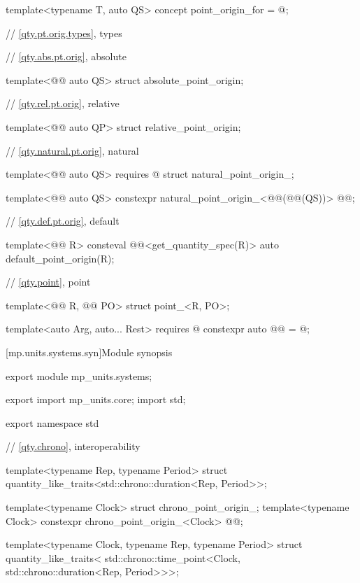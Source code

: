 \begin{codeblock}
{template<typename T, auto QS>
concept point_origin_for = @\seebelownc@;

// \ref{qty.pt.orig.types}, types

// \ref{qty.abs.pt.orig}, absolute

template<@@ auto QS>
struct absolute_point_origin;

// \ref{qty.rel.pt.orig}, relative

template<@@ auto QP>
struct relative_point_origin;

// \ref{qty.natural.pt.orig}, natural

template<@@ auto QS>
  requires @\seebelownc@
struct natural_point_origin_;

template<@@ auto QS>
constexpr natural_point_origin_<@@(@@(QS))> @@{};

// \ref{qty.def.pt.orig}, default

template<@@ R>
consteval @@<get_quantity_spec(R{})> auto default_point_origin(R);

// \ref{qty.point}, point

template<@@ R, @@ PO>
struct point_<R, PO>;

template<auto Arg, auto... Rest>
  requires @\seebelownc@
constexpr auto @@ = @\seebelownc@;

}
\end{codeblock}

[mp.units.systems.syn]{Module  synopsis}
%
\begin{codeblock}
export module mp_units.systems;

export import mp_units.core;
import std;

export namespace std {

// \ref{qty.chrono},  interoperability

template<typename Rep, typename Period>
struct quantity_like_traits<std::chrono::duration<Rep, Period>>;

template<typename Clock>
struct chrono_point_origin_;
template<typename Clock>
constexpr chrono_point_origin_<Clock> @@{};

template<typename Clock, typename Rep, typename Period>
struct quantity_like_traits<
  std::chrono::time_point<Clock, std::chrono::duration<Rep, Period>>>;

}
\end{codeblock}

